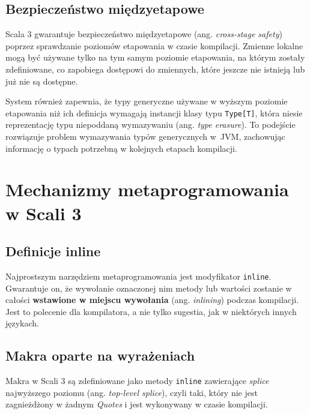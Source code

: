 \subsection{Bezpieczeństwo międzyetapowe}\label{subsec:bezpieczenstwo-miedzyetapowe}
Scala 3 gwarantuje bezpieczeństwo międzyetapowe (ang. \textit{cross-stage safety}) poprzez sprawdzanie poziomów etapowania w czasie kompilacji\cite{stucki2020thesis,stucki2021multistage}.
Zmienne lokalne mogą być używane tylko na tym samym poziomie etapowania, na którym zostały zdefiniowane, co zapobiega dostępowi do zmiennych, które jeszcze nie istnieją lub już nie są dostępne\cite{stucki2020thesis}.

System również zapewnia, że typy generyczne używane w wyższym poziomie etapowania niż ich definicja wymagają instancji klasy typu \verb|Type[T]|, która niesie reprezentację typu niepoddaną wymazywaniu (ang. \textit{type erasure})\cite{stucki2020thesis}.
To podejście rozwiązuje problem wymazywania typów generycznych w~JVM, zachowując informację o typach potrzebną w kolejnych etapach kompilacji.


\section{Mechanizmy metaprogramowania w Scali 3}\label{sec:mechanizmy-metaprogramowania-w-scali-3}

\subsection{Definicje inline}\label{subsec:definicje-inline}
Najprostszym narzędziem metaprogramowania jest modyfikator \verb|inline|.
Gwarantuje on, że wywołanie oznaczonej nim metody lub wartości zostanie w całości \textbf{wstawione w miejscu wywołania} (ang. \textit{inlining}) podczas kompilacji.
Jest to polecenie dla kompilatora, a nie tylko sugestia, jak w niektórych innych językach.

\subsection{Makra oparte na wyrażeniach}\label{subsec:makra-oparte-na-wyrazeniach}
Makra w Scali 3 są zdefiniowane jako metody \verb|inline| zawierające \textit{splice} najwyższego poziomu (ang. \textit{top-level splice})\cite{scala3-reference-macros,scala3-guides-macros}, czyli taki, który nie jest zagnieżdżony w żadnym \textit{Quotes} i jest wykonywany w czasie kompilacji\cite{scala3-staging,scala3-reference-macros}.

